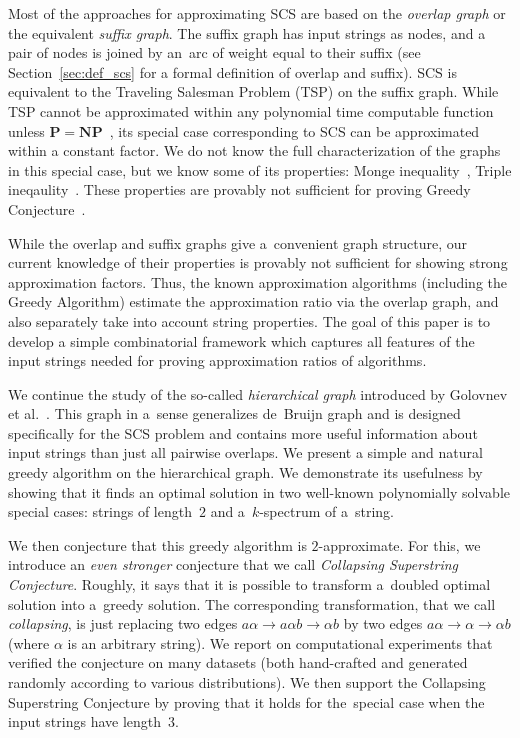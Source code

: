 \documentclass[11pt]{article}
\begin{document}


Most of the approaches for approximating SCS are based on the
{\em overlap graph} or the equivalent \emph{suffix graph}. The suffix graph has input strings as nodes, and a pair of nodes 
is joined by an~arc of weight equal to their suffix (see Section~\ref{sec:def_scs} for a formal definition of overlap and suffix).
SCS is equivalent to the Traveling Salesman Problem (TSP) on the suffix graph. While TSP cannot be approximated within any polynomial time computable function unless $\mathbf{P}=\mathbf{NP}$~\cite{SG1976}, its special case corresponding to SCS can be approximated within a constant factor. We do not know the full characterization of the graphs in this special case, but we know some of its properties: Monge inequality~\cite{monge}, Triple ineqaulity~\cite{weinard2006greedy}. These properties are provably not sufficient for proving Greedy Conjecture~\cite{weinard2006greedy, laube2005conditional}. 

While the overlap and suffix graphs give a~convenient graph structure, our current knowledge of their properties is provably not sufficient for showing strong approximation factors. Thus, the known approximation algorithms (including the Greedy Algorithm) estimate the approximation ratio via the overlap graph, and also separately take into account string properties. The goal of this paper is to develop a simple combinatorial framework which captures all features of the input strings needed for proving approximation ratios of algorithms.

We continue the study of the so-called {\em hierarchical graph}
introduced by Golovnev et al.~\cite{scs_exact}. This graph in a~sense generalizes de~Bruijn graph and is designed specifically 
for the SCS problem and contains more useful information about input strings
than just all pairwise overlaps. We present a simple and natural greedy algorithm
on the hierarchical graph. 
We demonstrate its usefulness by showing that it finds an optimal solution 
in two well-known polynomially solvable special cases: strings of length~$2$ and
a~$k$-spectrum of a~string.

We then conjecture that this greedy algorithm is $2$-approximate. For this, we introduce an {\em even stronger} conjecture that we call 
{\em Collapsing Superstring Conjecture}. 
Roughly, it says that it is possible to transform a~doubled optimal 
solution into a~greedy solution. 
The corresponding transformation, that we call {\em collapsing}, 
is just replacing two edges $a\alpha \to a\alpha b \to \alpha b$ 
by two edges $a\alpha \to \alpha \to \alpha b$ (where $\alpha$ is an arbitrary string). 
We report on computational experiments that verified the 
conjecture on many datasets (both hand-crafted and generated randomly
according to various distributions). 
We then support the Collapsing Superstring Conjecture by 
proving that it holds for the~special case when the input strings have length~3.
\end{document}
